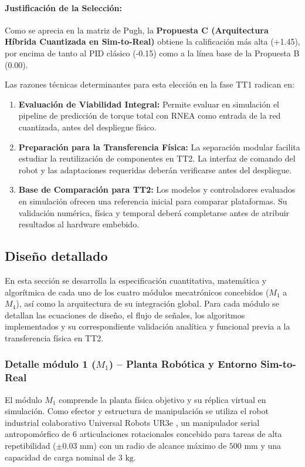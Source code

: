 \documentclass[12pt]{article}
\begin{document}
\paragraph{Justificación de la Selección:}
Como se aprecia en la matriz de Pugh, la \textbf{Propuesta C (Arquitectura Híbrida Cuantizada en Sim-to-Real)} obtiene la calificación más alta (+1.45), por encima de tanto al PID clásico (-0.15) como a la línea base de la Propuesta B (0.00).

Las razones técnicas determinantes para esta elección en la fase TT1 radican en:
\begin{enumerate}
    \item \textbf{Evaluación de Viabilidad Integral:} Permite evaluar en simulación el pipeline de predicción de torque total con RNEA como entrada de la red cuantizada, antes del despliegue físico.
    \item \textbf{Preparación para la Transferencia Física:} La separación modular facilita estudiar la reutilización de componentes en TT2. La interfaz de comando del robot y las adaptaciones requeridas deberán verificarse antes del despliegue.
    \item \textbf{Base de Comparación para TT2:} Los modelos y controladores evaluados en simulación ofrecen una referencia inicial para comparar plataformas. Su validación numérica, física y temporal deberá completarse antes de atribuir resultados al hardware embebido.
\end{enumerate}

\subsection{Diseño detallado}
\label{sec:diseno_detallado}

En esta sección se desarrolla la especificación cuantitativa, matemática y algorítmica de cada uno de los cuatro módulos mecatrónicos concebidos ($M_1$ a $M_4$), así como la arquitectura de su integración global. Para cada módulo se detallan las ecuaciones de diseño, el flujo de señales, los algoritmos implementados y su correspondiente validación analítica y funcional previa a la transferencia física en TT2.

\subsubsection{Detalle módulo 1 ($M_1$) -- Planta Robótica y Entorno Sim-to-Real}
\label{sssec:detalle_m1}

El módulo $M_1$ comprende la planta física objetivo y su réplica virtual en simulación. Como efector y estructura de manipulación se utiliza el robot industrial colaborativo Universal Robots UR3e \cite{universal_robots_ur3e_manual}, un manipulador serial antropomórfico de 6 articulaciones rotacionales concebido para tareas de alta repetibilidad ($\pm 0.03\text{ mm}$) con un radio de alcance máximo de $500\text{ mm}$ y una capacidad de carga nominal de $3\text{ kg}$.
\end{document}
